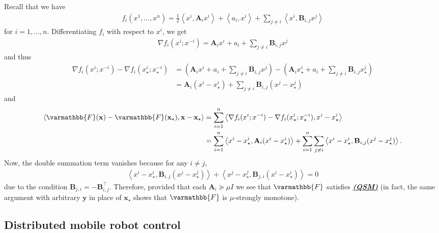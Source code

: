 \documentclass{article}
\newcommand{\vx}{{\mathbf{x}}}
\newcommand{\vy}{{\mathbf{y}}}
\newcommand{\vA}{{\mathbf{A}}}
\newcommand{\vB}{{\mathbf{B}}}
\newcommand{\opF}{{\varmathbb{F}}}
\newcommand{\inprod}[2]{\left\langle #1,#2 \right\rangle}
\theoremstyle{plain}
\theoremstyle{remark}
\begin{document}
Recall that we have
\begin{align*}
    f_i (x^1, \dots, x^n) = \frac{1}{2} \inprod{x^i}{\vA_i x^i} + \inprod{a_i}{x^i} + \sum_{j\ne i} \inprod{x^i}{\vB_{i,j} x^j} 
\end{align*}
for $i=1,\dots,n$. 
Differentiating $f_i$ with respect to $x^i$, we get
\begin{align*}
    \nabla f_i(x^i; x^{-i}) = \vA_i x^i + a_i + \sum_{j\ne i} \vB_{i,j} x^j 
\end{align*}
and thus
\begin{align*}
    \nabla f_i(x^i; x^{-i}) - \nabla f_i(x_\star^i; x_\star^{-i}) & = \left( \vA_i x^i + a_i + \sum_{j\ne i} \vB_{i,j} x^j \right) - \left( \vA_i x_\star^i + a_i + \sum_{j\ne i} \vB_{i,j} x_\star^j \right) \\
    & = \vA_i (x^i - x_\star^i) + \sum_{j\ne i} \vB_{i,j} (x^j - x_\star^j) 
\end{align*}
and 
\begin{align*}
    \inprod{\opF(\vx) - \opF(\vx_\star)}{\vx - \vx_\star} & = \sum_{i=1}^n \inprod{\nabla f_i(x^i; x^{-i}) - \nabla f_i(x_\star^i; x_\star^{-i})}{x^i - x_\star^i} \\
    & = \sum_{i=1}^n \inprod{x^i - x_\star^i}{\vA_i (x^i - x_\star^i)} + \sum_{i=1}^n \sum_{j\ne i} \inprod{x^i - x_\star^i}{\vB_{i,j} (x^j - x_\star^j)} .
\end{align*}
Now, the double summation term vanishes because for any $i\ne j$, 
\begin{align*}
    \inprod{x^i - x_\star^i}{\vB_{i,j} (x^j - x_\star^j)} + \inprod{x^j - x_\star^j}{\vB_{j,i} (x^i - x_\star^i)} = 0 
\end{align*}
due to the condition $\vB_{j,i} = -\vB_{i,j}^\intercal$.
Therefore, provided that each $\vA_i \succeq \mu I$ we see that $\opF$ satisfies \hyperref[assumption:quasi-strong-monotonicity]{\textbf{\emph{(QSM)}}} 
(in fact, the same argument with arbitrary $\vy$ in place of $\vx_\star$ shows that $\opF$ is $\mu$-strongly monotone).

\subsection{Distributed mobile robot control}
\end{document}

